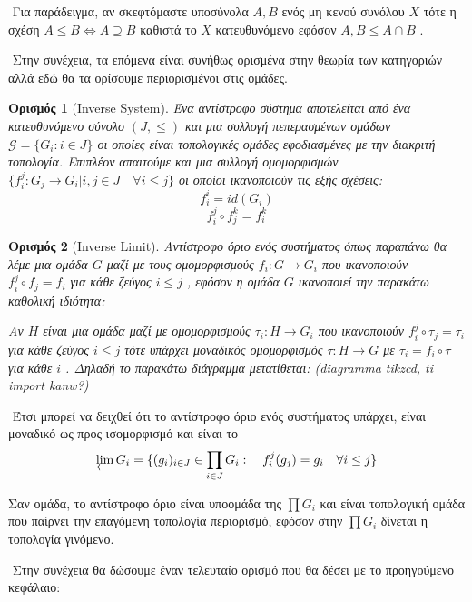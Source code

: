 \documentclass[oneside,a4paper]{article}
\newtheorem*{defn}{Ορισμός}
\newcommand {\tl}{\textlatin}
\begin{document}
$ $\newline
\noindent Για παράδειγμα, αν σκεφτόμαστε υποσύνολα $A,B$ ενός μη κενού συνόλου $X$ τότε η σχέση $A\leq B \iff A\supseteq B$ καθιστά το $X$ κατευθυνόμενο εφόσον $A, B \leq A\cap B$ .

$ $\newline
\noindent Στην συνέχεια, τα επόμενα είναι συνήθως ορισμένα στην θεωρία των κατηγοριών αλλά εδώ θα τα ορίσουμε περιορισμένοι στις ομάδες.

\begin{defn}[\tl{Inverse System}] Ένα αντίστροφο σύστημα αποτελείται από ένα κατευθυνόμενο σύνολο $(J,\leq )$ και μια συλλογή πεπερασμένων ομάδων $\mathcal{G} = \{G_i : i \in J\}$ οι οποίες είναι τοπολογικές ομάδες εφοδιασμένες με την διακριτή τοπολογία. Επιπλέον απαιτούμε και μια συλλογή ομομορφισμών $\{f^j_i : G_j \rightarrow G_i | i,j \in J \quad\forall i\leq j\}$ οι οποίοι ικανοποιούν τις εξής σχέσεις:
$$f^i_i = id(G_i)$$
$$f^j_i \circ f^k_j = f^k_i$$
\end{defn}

\begin{defn}[\tl{Inverse Limit}] Αντίστροφο όριο ενός συστήματος όπως παραπάνω θα λέμε μια ομάδα $G$ μαζί με τους ομομορφισμούς $f_i : G \rightarrow G_i$ που ικανοποιούν $f^j_i \circ f_j = f_i$ για κάθε ζεύγος $i \leq j$ , εφόσον η ομάδα $G$ ικανοποιεί την παρακάτω καθολική ιδιότητα:

Αν $H$ είναι μια ομάδα μαζί με ομομορφισμούς $\tau_i : H \rightarrow G_i$ που ικανοποιούν $f^j_i \circ \tau_j = \tau_i$ για κάθε ζεύγος $i\leq j$ τότε υπάρχει μοναδικός ομομορφισμός $\tau : H  \rightarrow G$ με $\tau_i = f_i \circ \tau$ για κάθε $i$ . Δηλαδή το παρακάτω διάγραμμα μετατίθεται:
(diagramma tikzcd, ti import kanw?)
\end{defn}

$ $\newline
Έτσι μπορεί να δειχθεί ότι το αντίστροφο όριο ενός συστήματος υπάρχει, είναι μοναδικό ως προς ισομορφισμό και είναι το 
$$\varprojlim G_i  = \{(g_i)_{i \in J} \in \prod\limits_{i \in J} G_i : \quad f^j_i (g_j) = g_i \quad\forall i\leq j\}$$

\noindent Σαν ομάδα, το αντίστροφο όριο είναι υποομάδα της $\prod G_i$ και είναι τοπολογική ομάδα που παίρνει την επαγόμενη τοπολογία περιορισμό, εφόσον στην $\prod G_i$ δίνεται η τοπολογία γινόμενο.

$ $\newline
\noindent Στην συνέχεια θα δώσουμε έναν τελευταίο ορισμό που θα δέσει με το προηγούμενο κεφάλαιο:
\end{document}
